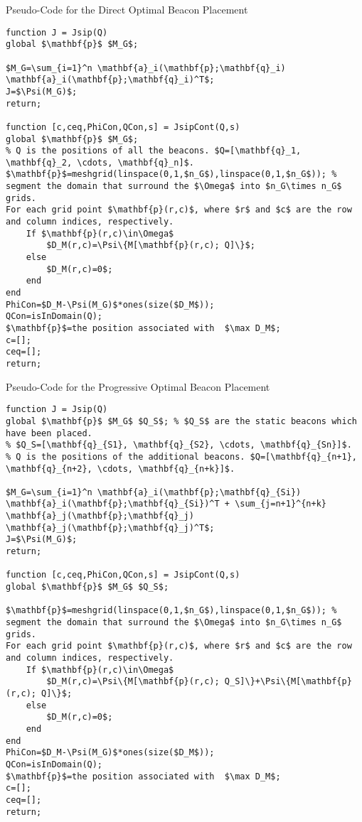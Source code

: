 \begin{table}
\caption{Pseudo-Code for the Direct Optimal Beacon Placement} \label{t:dirBplac}
\lstset{language=Matlab, breaklines=true, numbers=left, texcl, mathescape=true }
\begin{lstlisting}
function J = Jsip(Q)
global $\mathbf{p}$ $M_G$;

$M_G=\sum_{i=1}^n \mathbf{a}_i(\mathbf{p};\mathbf{q}_i) \mathbf{a}_i(\mathbf{p};\mathbf{q}_i)^T$;
J=$\Psi(M_G)$;
return;

function [c,ceq,PhiCon,QCon,s] = JsipCont(Q,s)
global $\mathbf{p}$ $M_G$;
% Q is the positions of all the beacons. $Q=[\mathbf{q}_1, \mathbf{q}_2, \cdots, \mathbf{q}_n]$.
$\mathbf{p}$=meshgrid(linspace(0,1,$n_G$),linspace(0,1,$n_G$)); % segment the domain that surround the $\Omega$ into $n_G\times n_G$ grids.
For each grid point $\mathbf{p}(r,c)$, where $r$ and $c$ are the row and column indices, respectively.
    If $\mathbf{p}(r,c)\in\Omega$
        $D_M(r,c)=\Psi\{M[\mathbf{p}(r,c); Q]\}$;
    else
        $D_M(r,c)=0$;
    end
end
PhiCon=$D_M-\Psi(M_G)$*ones(size($D_M$));
QCon=isInDomain(Q);
$\mathbf{p}$=the position associated with  $\max D_M$;
c=[];
ceq=[];
return;
\end{lstlisting}
\end{table}



\begin{table}
\caption{Pseudo-Code for the Progressive Optimal Beacon Placement} \label{t:proBplac}
\lstset{language=Matlab, breaklines=true, numbers=left, texcl, mathescape=true }
\begin{lstlisting}
function J = Jsip(Q)
global $\mathbf{p}$ $M_G$ $Q_S$; % $Q_S$ are the static beacons which have been placed.
% $Q_S=[\mathbf{q}_{S1}, \mathbf{q}_{S2}, \cdots, \mathbf{q}_{Sn}]$.
% Q is the positions of the additional beacons. $Q=[\mathbf{q}_{n+1}, \mathbf{q}_{n+2}, \cdots, \mathbf{q}_{n+k}]$.

$M_G=\sum_{i=1}^n \mathbf{a}_i(\mathbf{p};\mathbf{q}_{Si}) \mathbf{a}_i(\mathbf{p};\mathbf{q}_{Si})^T + \sum_{j=n+1}^{n+k} \mathbf{a}_j(\mathbf{p};\mathbf{q}_j) \mathbf{a}_j(\mathbf{p};\mathbf{q}_j)^T$;
J=$\Psi(M_G)$;
return;

function [c,ceq,PhiCon,QCon,s] = JsipCont(Q,s)
global $\mathbf{p}$ $M_G$ $Q_S$;

$\mathbf{p}$=meshgrid(linspace(0,1,$n_G$),linspace(0,1,$n_G$)); % segment the domain that surround the $\Omega$ into $n_G\times n_G$ grids.
For each grid point $\mathbf{p}(r,c)$, where $r$ and $c$ are the row and column indices, respectively.
    If $\mathbf{p}(r,c)\in\Omega$
        $D_M(r,c)=\Psi\{M[\mathbf{p}(r,c); Q_S]\}+\Psi\{M[\mathbf{p}(r,c); Q]\}$;
    else
        $D_M(r,c)=0$;
    end
end
PhiCon=$D_M-\Psi(M_G)$*ones(size($D_M$));
QCon=isInDomain(Q);
$\mathbf{p}$=the position associated with  $\max D_M$;
c=[];
ceq=[];
return;
\end{lstlisting}
\end{table}


